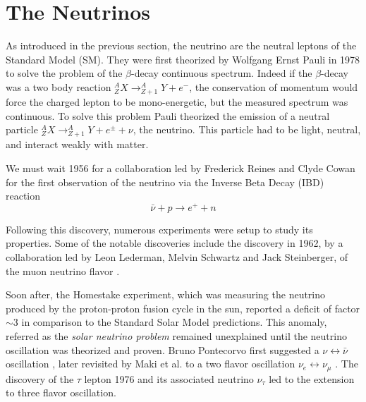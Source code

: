 \section{The Neutrinos}
\label{sec:neutrino:th}

As introduced in the previous section, the neutrino are the neutral leptons of the Standard Model (SM). They were first theorized by Wolfgang Ernst Pauli in 1978 \cite{pauli_dear_1978} to solve the problem of the $\beta$-decay continuous spectrum. Indeed if the $\beta$-decay was a two body reaction $^A_Z X \rightarrow ^A_{Z + 1}Y + e^{-}$, the conservation of momentum would force the charged lepton to be mono-energetic, but the measured spectrum was continuous. To solve this problem Pauli theorized the emission of a neutral particle $^A_Z X \rightarrow ^A_{Z + 1}Y + e^{\pm} + \nu$, the neutrino. This particle had to be light, neutral, and interact weakly with matter.

We must wait 1956 for a collaboration led by Frederick Reines and Clyde Cowan for the first observation of the neutrino \cite{reines_neutrino_1956, cowan_detection_1956} via the Inverse Beta Decay (IBD) reaction
\begin{equation}
  \bar{\nu} + p \rightarrow e^+ + n
\end{equation}

Following this discovery, numerous experiments were setup to study its properties. Some of the notable discoveries include the discovery in 1962, by a collaboration led by Leon Lederman, Melvin Schwartz and Jack Steinberger, of the muon neutrino flavor \cite{danby_observation_1962}.

Soon after, the Homestake experiment, which was measuring the neutrino produced by the proton-proton fusion cycle in the sun, reported a deficit of factor $\sim 3$ \cite{davis_review_1994} in comparison to the Standard Solar Model predictions. This anomaly, referred as the \textit{solar neutrino problem} remained unexplained until the neutrino oscillation was theorized and proven. Bruno Pontecorvo first suggested a $\nu \leftrightarrow \bar{\nu}$ oscillation \cite{pontecorvo_mesonium_1957}, later revisited by Maki et al. to a two flavor oscillation $\nu_e \leftrightarrow \nu_\mu$ \cite{maki_remarks_1962}. The discovery of the $\tau$ lepton 1976 \cite{perl_evidence_1975} and its associated neutrino $\nu_\tau$ \cite{kodama_observation_2001} led to the extension to three flavor oscillation.

